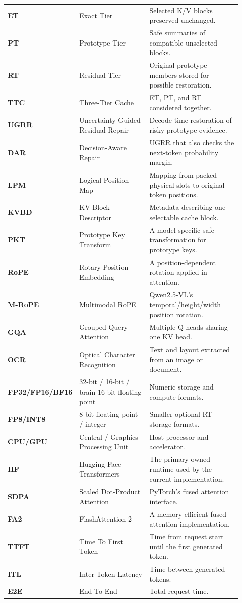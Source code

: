 \documentclass[11pt]{article}
\begin{document}
\begin{longtable}{>{\bfseries}p{0.15\linewidth}p{0.34\linewidth}p{0.43\linewidth}}
ET & Exact Tier & Selected K/V blocks preserved unchanged. \\
PT & Prototype Tier & Safe summaries of compatible unselected blocks. \\
RT & Residual Tier & Original prototype members stored for possible restoration. \\
TTC & Three-Tier Cache & ET, PT, and RT considered together. \\
UGRR & Uncertainty-Guided Residual Repair & Decode-time restoration of risky prototype evidence. \\
DAR & Decision-Aware Repair & UGRR that also checks the next-token probability margin. \\
LPM & Logical Position Map & Mapping from packed physical slots to original token positions. \\
KVBD & KV Block Descriptor & Metadata describing one selectable cache block. \\
PKT & Prototype Key Transform & A model-specific safe transformation for prototype keys. \\
RoPE & Rotary Position Embedding & A position-dependent rotation applied in attention. \\
M-RoPE & Multimodal RoPE & Qwen2.5-VL's temporal/height/width position rotation. \\
GQA & Grouped-Query Attention & Multiple Q heads sharing one KV head. \\
OCR & Optical Character Recognition & Text and layout extracted from an image or document. \\
FP32/FP16/BF16 & 32-bit / 16-bit / brain 16-bit floating point & Numeric storage and compute formats. \\
FP8/INT8 & 8-bit floating point / integer & Smaller optional RT storage formats. \\
CPU/GPU & Central / Graphics Processing Unit & Host processor and accelerator. \\
HF & Hugging Face Transformers & The primary owned runtime used by the current implementation. \\
SDPA & Scaled Dot-Product Attention & PyTorch's fused attention interface. \\
FA2 & FlashAttention-2 & A memory-efficient fused attention implementation. \\
TTFT & Time To First Token & Time from request start until the first generated token. \\
ITL & Inter-Token Latency & Time between generated tokens. \\
E2E & End To End & Total request time. \\

\end{longtable}
\end{document}
